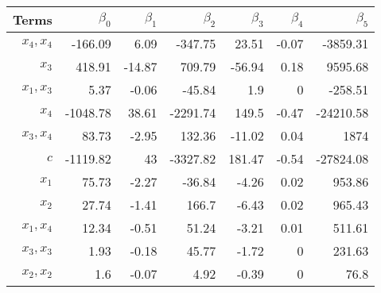 \begin{tabular}{rrrrrrr}
Terms & $\beta_0$ & $\beta_1$ & $\beta_2$ & $\beta_3$ & $\beta_4$ & $\beta_5$ \\ 
\hline 
$x_4,x_4$ & -166.09 & 6.09 & -347.75 & 23.51 & -0.07 & -3859.31 \\ 
$x_3$ & 418.91 & -14.87 & 709.79 & -56.94 & 0.18 & 9595.68 \\ 
$x_1,x_3$ & 5.37 & -0.06 & -45.84 & 1.9 & 0 & -258.51 \\ 
$x_4$ & -1048.78 & 38.61 & -2291.74 & 149.5 & -0.47 & -24210.58 \\ 
$x_3,x_4$ & 83.73 & -2.95 & 132.36 & -11.02 & 0.04 & 1874 \\ 
$c$ & -1119.82 & 43 & -3327.82 & 181.47 & -0.54 & -27824.08 \\ 
$x_1$ & 75.73 & -2.27 & -36.84 & -4.26 & 0.02 & 953.86 \\ 
$x_2$ & 27.74 & -1.41 & 166.7 & -6.43 & 0.02 & 965.43 \\ 
$x_1,x_4$ & 12.34 & -0.51 & 51.24 & -3.21 & 0.01 & 511.61 \\ 
$x_3,x_3$ & 1.93 & -0.18 & 45.77 & -1.72 & 0 & 231.63 \\ 
$x_2,x_2$ & 1.6 & -0.07 & 4.92 & -0.39 & 0 & 76.8 \\ 
\hline 
\end{tabular}